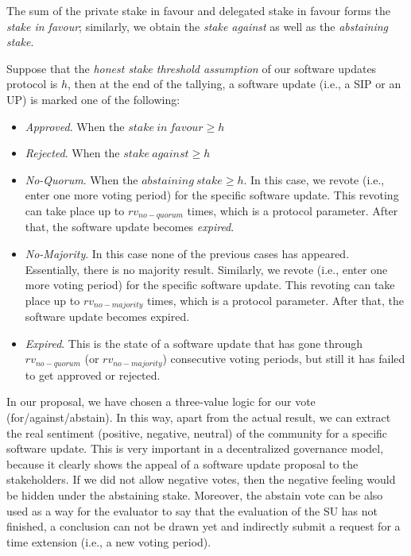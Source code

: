 The sum of the private stake in favour and delegated stake in favour forms the \emph{stake in favour}; similarly, we obtain the \emph{stake against} as well as the \emph{abstaining stake}.

Suppose that the \emph{honest stake threshold assumption} of our software updates protocol is $h$, then at the end of the tallying, a software update (i.e., a SIP or an UP) is marked one of the following:
\begin{itemize}

\item \emph{Approved}. When the $stake\ in\ favour \geq h$

\item \emph{Rejected}. When the $stake\ against \geq h$

\item \emph{No-Quorum}. When the $abstaining\ stake \geq h$. In this case, we revote (i.e., enter one more voting period) for the specific software update. This revoting can take place up to $rv_{no-quorum}$ times, which is a protocol parameter. After that, the software update becomes \emph{expired}.

\item \emph{No-Majority}. In this case none of the previous cases has appeared. Essentially, there is no majority result. Similarly, we revote (i.e., enter one more voting period) for the specific software update. This revoting can take place up to $rv_{no-majority}$ times, which is a protocol parameter. After that, the software update becomes expired.

\item \emph{Expired}. This is the state of a software update that has gone through $rv_{no-quorum}$ (or $rv_{no-majority}$) consecutive voting periods, but still it has failed to get approved or rejected.
\end{itemize}

In our proposal, we have chosen a three-value logic for our vote (for/against/abstain). In this way, apart from the actual result, we can extract the real sentiment (positive, negative, neutral) of the community for a specific software update. This is very important in a decentralized governance model, because it clearly shows the appeal of a software update proposal to the stakeholders. If we did not allow negative votes, then the negative feeling would be hidden under the abstaining stake. 
Moreover, the abstain vote can be also used as a way for the evaluator to say that the evaluation of the SU has not finished, a conclusion can not be drawn yet and indirectly submit a request for a time extension (i.e., a new voting period).

